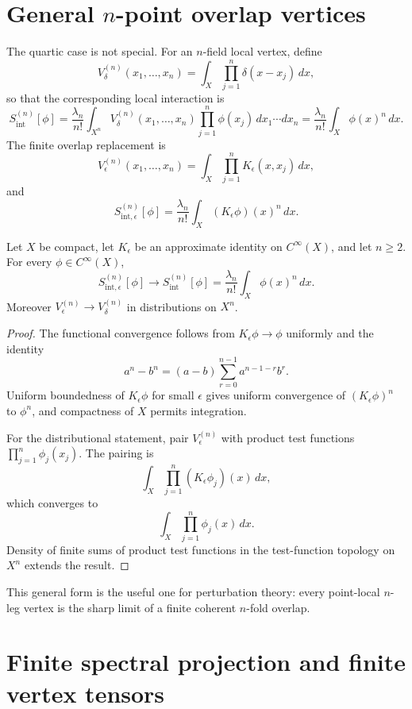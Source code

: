 \documentclass[11pt]{article}
\begin{document}
\section{General \(n\)-point overlap vertices}

The quartic case is not special.  For an \(n\)-field local vertex, define
\[
V_{\delta}^{(n)}(x_1,\ldots,x_n)
=
\int_X\prod_{j=1}^{n}\delta(x-x_j)\,dx ,
\]
so that the corresponding local interaction is
\[
S_{\mathrm{int}}^{(n)}[\phi]
=
\frac{\lambda_n}{n!}
\int_{X^n}
V_{\delta}^{(n)}(x_1,\ldots,x_n)
\prod_{j=1}^{n}\phi(x_j)\,dx_1\cdots dx_n
=
\frac{\lambda_n}{n!}\int_X\phi(x)^n\,dx .
\]
The finite overlap replacement is
\[
V_{\epsilon}^{(n)}(x_1,\ldots,x_n)
=
\int_X\prod_{j=1}^{n}K_\epsilon(x,x_j)\,dx ,
\]
and
\[
S_{\mathrm{int},\epsilon}^{(n)}[\phi]
=
\frac{\lambda_n}{n!}\int_X (K_\epsilon\phi)(x)^n\,dx .
\]

\begin{proposition}
Let \(X\) be compact, let \(K_\epsilon\) be an approximate identity on \(C^\infty(X)\), and
let \(n\ge2\).  For every \(\phi\in C^\infty(X)\),
\[
S_{\mathrm{int},\epsilon}^{(n)}[\phi]
\longrightarrow
S_{\mathrm{int}}^{(n)}[\phi]
=
\frac{\lambda_n}{n!}\int_X\phi(x)^n\,dx .
\]
Moreover \(V_{\epsilon}^{(n)}\to V_{\delta}^{(n)}\) in distributions on \(X^n\).
\end{proposition}

\begin{proof}
The functional convergence follows from \(K_\epsilon\phi\to\phi\) uniformly and the identity
\[
a^n-b^n=(a-b)\sum_{r=0}^{n-1}a^{n-1-r}b^r .
\]
Uniform boundedness of \(K_\epsilon\phi\) for small \(\epsilon\) gives uniform convergence of
\((K_\epsilon\phi)^n\) to \(\phi^n\), and compactness of \(X\) permits integration.

For the distributional statement, pair \(V_{\epsilon}^{(n)}\) with product test functions
\(\prod_{j=1}^n\phi_j(x_j)\).  The pairing is
\[
\int_X\prod_{j=1}^n(K_\epsilon\phi_j)(x)\,dx,
\]
which converges to
\[
\int_X\prod_{j=1}^n\phi_j(x)\,dx.
\]
Density of finite sums of product test functions in the test-function topology on \(X^n\)
extends the result.
\end{proof}

This general form is the useful one for perturbation theory: every point-local \(n\)-leg
vertex is the sharp limit of a finite coherent \(n\)-fold overlap.

\section{Finite spectral projection and finite vertex tensors}
\end{document}
